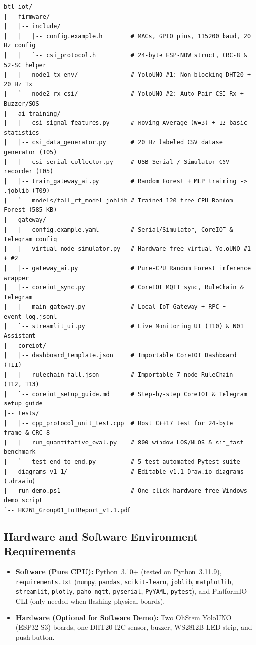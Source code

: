 \documentclass{hcmut-report}
\begin{document}
\begin{lstlisting}[caption={Streamlined Version~1.1 Repository Structure}, label={lst:repo_tree}]
btl-iot/
|-- firmware/
|   |-- include/
|   |   |-- config.example.h        # MACs, GPIO pins, 115200 baud, 20 Hz config
|   |   `-- csi_protocol.h          # 24-byte ESP-NOW struct, CRC-8 & 52-SC helper
|   |-- node1_tx_env/               # YoloUNO #1: Non-blocking DHT20 + 20 Hz Tx
|   `-- node2_rx_csi/               # YoloUNO #2: Auto-Pair CSI Rx + Buzzer/SOS
|-- ai_training/
|   |-- csi_signal_features.py      # Moving Average (W=3) + 12 basic statistics
|   |-- csi_data_generator.py       # 20 Hz labeled CSV dataset generator (T05)
|   |-- csi_serial_collector.py     # USB Serial / Simulator CSV recorder (T05)
|   |-- train_gateway_ai.py         # Random Forest + MLP training -> .joblib (T09)
|   `-- models/fall_rf_model.joblib # Trained 120-tree CPU Random Forest (585 KB)
|-- gateway/
|   |-- config.example.yaml         # Serial/Simulator, CoreIOT & Telegram config
|   |-- virtual_node_simulator.py   # Hardware-free virtual YoloUNO #1 + #2
|   |-- gateway_ai.py               # Pure-CPU Random Forest inference wrapper
|   |-- coreiot_sync.py             # CoreIOT MQTT sync, RuleChain & Telegram
|   |-- main_gateway.py             # Local IoT Gateway + RPC + event_log.jsonl
|   `-- streamlit_ui.py             # Live Monitoring UI (T10) & N01 Assistant
|-- coreiot/
|   |-- dashboard_template.json     # Importable CoreIOT Dashboard (T11)
|   |-- rulechain_fall.json         # Importable 7-node RuleChain (T12, T13)
|   `-- coreiot_setup_guide.md      # Step-by-step CoreIOT & Telegram setup guide
|-- tests/
|   |-- cpp_protocol_unit_test.cpp  # Host C++17 test for 24-byte frame & CRC-8
|   |-- run_quantitative_eval.py    # 800-window LOS/NLOS & sit_fast benchmark
|   `-- test_end_to_end.py          # 5-test automated Pytest suite
|-- diagrams_v1_1/                  # Editable v1.1 Draw.io diagrams (.drawio)
|-- run_demo.ps1                    # One-click hardware-free Windows demo script
`-- HK261_Group01_IoTReport_v1.1.pdf
\end{lstlisting}

\subsection{Hardware and Software Environment Requirements}
\begin{itemize}
  \item \textbf{Software (Pure CPU):} Python~3.10+ (tested on Python~3.11.9), \texttt{requirements.txt} (\texttt{numpy}, \texttt{pandas}, \texttt{scikit-learn}, \texttt{joblib}, \texttt{matplotlib}, \texttt{streamlit}, \texttt{plotly}, \texttt{paho-mqtt}, \texttt{pyserial}, \texttt{PyYAML}, \texttt{pytest}), and PlatformIO CLI (only needed when flashing physical boards).
  \item \textbf{Hardware (Optional for Software Demo):} Two OhStem YoloUNO (ESP32-S3) boards, one DHT20 I2C sensor, buzzer, WS2812B LED strip, and push-button.
\end{itemize}
\end{document}
